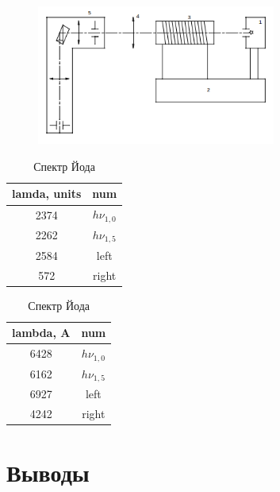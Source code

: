 \documentclass{article}
\begin{document}
\begin{figure}[H]
	\centering
	\includegraphics[width=0.7\textwidth]{scheme-iodine.png}
\end{figure}

\begin{table}[H]
	\centering
\begin{tabular}{|c|c|}
	\hline
lamda, units & num							\\\hline
	2374         & \(h\nu_{1,0}\) \\\hline
2262         &  \(h\nu_{1,5}\)	\\\hline
2584         & left							\\\hline
572          & right						\\\hline
\end{tabular}
	\caption{Спектр Йода}
\end{table}

\begin{table}[H]
	\centering
\begin{tabular}{|c|c|}
	\hline
lambda, A         & num \\\hline
6428 & \(h\nu_{1,0}\)   \\\hline
6162 & \(h\nu_{1,5}\)   \\\hline
6927 & left					    \\\hline
4242 & right						\\\hline
\end{tabular}
	\caption{Спектр Йода}
\end{table}

\section{Выводы}
\end{document}
